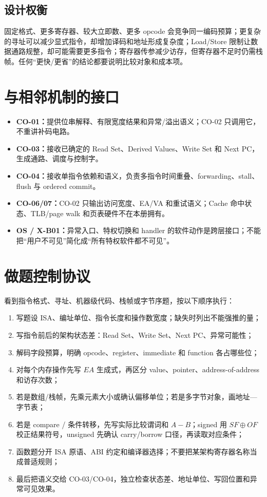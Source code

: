 \documentclass[UTF8,fontset=fandol,11pt,a4paper]{ctexart}
\newcommand{\kw}[1]{\textbf{\color{deep}#1}}
\begin{document}
\subsection{设计权衡}
固定格式、更多寄存器、较大立即数、更多 opcode 会竞争同一编码预算；更复杂的寻址可以减少显式指令，却增加译码和地址形成复杂度；Load/Store 限制让数据通路规整，却可能需要更多指令；寄存器传参减少访存，但寄存器不足时仍需栈帧。任何“更快/更省”的结论都要说明比较对象和成本项。

\section{与相邻机制的接口}

\begin{itemize}
  \item \kw{CO-01：}提供位串解释、有限宽度结果和异常/溢出语义；CO-02 只调用它，不重讲补码电路。
  \item \kw{CO-03：}接收已确定的 Read Set、Derived Values、Write Set 和 Next PC，生成通路、调度与控制字。
  \item \kw{CO-04：}接收单指令依赖和语义，负责多指令时间重叠、forwarding、stall、flush 与 ordered commit。
  \item \kw{CO-06/07：}CO-02 只输出访问宽度、EA/VA 和重试语义；Cache 命中状态、TLB/page walk 和页表硬件不在本册拥有。
  \item \kw{OS / X-B01：}异常入口、特权切换和 handler 的软件动作是跨层接口；不能把“用户不可见”简化成“所有特权软件都不可见”。
\end{itemize}

\section{做题控制协议}

看到指令格式、寻址、机器级代码、栈帧或字节序题，按以下顺序执行：
\begin{enumerate}
  \item 写题设 ISA、编址单位、指令长度和操作数宽度；缺失时列出不能强推的量；
  \item 写指令前后的架构状态差：Read Set、Write Set、Next PC、异常可能性；
  \item 解码字段预算，明确 opcode、register、immediate 和 function 各占哪些位；
  \item 对每个内存操作先写 $EA$ 生成式，再区分 value、pointer、address-of-address 和访存次数；
  \item 若是数组/栈帧，先乘元素大小或确认偏移单位；若是多字节对象，画地址—字节表；
  \item 若是 compare / 条件转移，先写实际比较谓词和 $A-B$；signed 用 $SF\oplus OF$ 校正结果符号，unsigned 先确认 carry/borrow 口径，再读取对应条件；
  \item 函数题分开 ISA 原语、ABI 约定和编译器选择；不要把某架构寄存器名称当成普适规则；
  \item 最后把语义交给 CO-03/CO-04，独立检查状态差、地址单位、写回位置和异常可见效果。
\end{enumerate}
\end{document}
